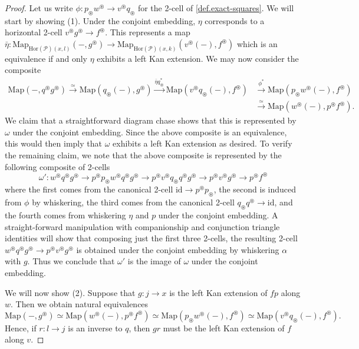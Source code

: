 \documentclass[a4paper, 11pt]{amsart}
\numberwithin{theorem}{section}
\theoremstyle{definition}
\newcommand{\map}{\mathrm{Map}}
\renewcommand{\P}{\mathscr{P}}
\newcommand{\Hor}{\mathrm{Hor}}
\newcommand{\id}{\mathrm{id}}
\begin{document}
\begin{proof}
	Let us write $\phi : p_\circledast w^\circledast \to v^\circledast q_\circledast$ for the 2-cell of \cref{def.exact-squares}.
	We will start by showing (1).
	Under the conjoint embedding, $\eta$ corresponds to a horizontal 2-cell $v^\circledast g^\circledast \to f^\circledast$. 
	This represents a map $\bar{\eta} : \map_{\Hor(\P)(x,l)}(-, g^\circledast) \to \map_{\Hor(\P)(x,k)}(v^\circledast (-), f^\circledast)$
	which is an equivalence if and only $\eta$ exhibits a left Kan extension. We may now consider the composite
	\begin{align*}
	\map(-,q^\circledast g^\circledast) \xrightarrow{\simeq} \map(q_\circledast(-), g^\circledast) \xrightarrow{\bar{\eta}q_\circledast^*} \map(v^\circledast q_\circledast (-), f^\circledast) &\xrightarrow{\phi^*} \map(p_\circledast w^\circledast(-), f^\circledast) \\ 
	& \xrightarrow{\simeq} \map(w^\circledast(-), p^\circledast f^\circledast).
	\end{align*}
	We claim that a straightforward diagram chase shows that this is represented by $\omega$ under the conjoint embedding. Since the above composite 
	is an equivalence, this would then imply that $\omega$ exhibits a left Kan extension as desired.
	To verify the remaining claim, 
	we note that the above composite is represented by the following composite of 2-cells $$\omega' : w^\circledast q^\circledast g^\circledast \to p^\circledast p_\circledast w^\circledast q^\circledast g^\circledast \to p^\circledast v^\circledast q_\circledast q^\circledast g^\circledast \to p^\circledast v^\circledast g^\circledast \to p^\circledast f^\circledast$$
	 where the first comes from the canonical 2-cell $\id \to p^\circledast p_\circledast$, the second is induced from $\phi$ by whiskering, the third  
	comes from the canonical 2-cell $q_\circledast q^\circledast \to \id$, and the fourth comes from whiskering $\eta$ and $p$ under the conjoint embedding. A straight-forward manipulation with companionship and conjunction 
	triangle identities will show that composing just the first three 2-cells, the resulting 2-cell $w^\circledast q^\circledast g^\circledast \to p^\circledast v^\circledast g^\circledast$ is 
	obtained under the conjoint embedding by whiskering $\alpha$ with $g$. Thus we conclude that $\omega'$ is the image of $\omega$ under the conjoint embedding.

	We will now show (2). Suppose that $g : j \to x$ is the left Kan extension of $fp$ along $w$. Then we obtain natural equivalences 
	$$
	\map(-, g^\circledast) \simeq \map(w^\circledast(-), p^\circledast f^\circledast) \simeq \map(p_\circledast w^\circledast (-), f^\circledast) \simeq 
	\map(v^\circledast q_\circledast(-),f^\circledast).
	$$
	Hence, if $r : l\to j$ is an inverse to $q$, then $gr$ must be the left Kan extension of $f$ along $v$.
\end{proof}
\end{document}
